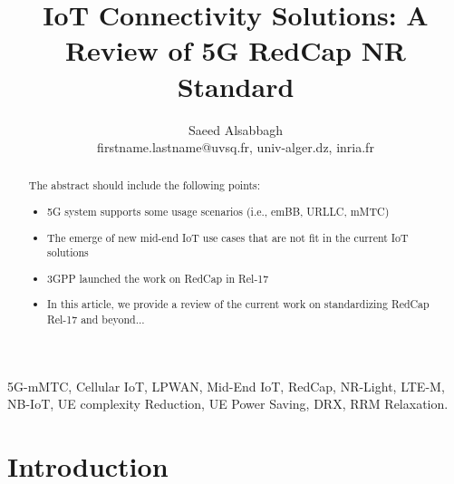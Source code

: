 \documentclass[conference]{IEEEtran}
\begin{document}
\title{IoT Connectivity Solutions: A Review of 5G RedCap NR Standard}


\author{Saeed Alsabbagh 


firstname.lastname@uvsq.fr, univ-alger.dz, 
inria.fr
\vspace{0mm}
}


\maketitle

\begin{abstract}
The abstract should include the following points:
\begin{itemize}
    \item   5G system supports some usage scenarios (i.e., emBB, URLLC, mMTC)
    \item   The emerge of new mid-end IoT use cases that are not fit in the current IoT solutions
    \item   3GPP launched the work on RedCap in Rel-17
    \item   In this article, we provide a review of the current work on standardizing RedCap Rel-17 and beyond...
\end{itemize}


\end{abstract}

\begin{IEEEkeywords}
5G-mMTC, Cellular IoT, LPWAN, Mid-End IoT, RedCap, NR-Light, LTE-M, NB-IoT, UE complexity Reduction, UE Power Saving, DRX, RRM Relaxation.
\end{IEEEkeywords}



\section{Introduction}
\label{sec:1-Inro}
\end{document}
